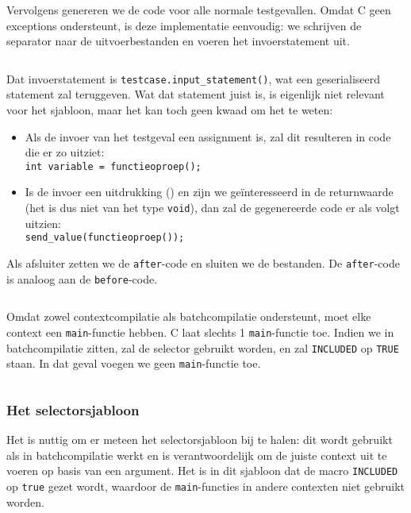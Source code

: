\inputminted[firstline=38,lastline=49]{mako}{sources/c-context.mako}

Vervolgens genereren we de code voor alle normale testgevallen.
Omdat C geen exceptions ondersteunt, is deze implementatie eenvoudig: we schrijven de separator naar de uitvoerbestanden en voeren het invoerstatement uit.

\inputminted[firstline=52,lastline=56]{mako}{sources/c-context.mako}

Dat invoerstatement is \texttt{testcase.input\_statement()}, wat een geserialiseerd statement zal teruggeven.
Wat dat statement juist is, is eigenlijk niet relevant voor het sjabloon, maar het kan toch geen kwaad om het te weten:

\begin{itemize}
    \item Als de invoer van het testgeval een assignment is, zal dit resulteren in code die er zo uitziet: \\
    \texttt{int variable = functieoproep();}
    
    \item Is de invoer een uitdrukking () en zijn we geïnteresseerd in de returnwaarde (het is dus niet van het type \texttt{void}), dan zal de gegenereerde code er als volgt uitzien: \\
    \texttt{send_value(functieoproep());}
\end{itemize}

Als afsluiter zetten we de \texttt{after}-code en sluiten we de bestanden.
De \texttt{after}-code is analoog aan de \texttt{before}-code.

\inputminted[firstline=58,lastline=63]{mako}{sources/c-context.mako}

Omdat \tested{} zowel contextcompilatie als batchcompilatie ondersteunt, moet elke context een \texttt{main}-functie hebben.
C laat slechts 1 \texttt{main}-functie toe.
Indien we in batchcompilatie zitten, zal de selector gebruikt worden, en zal \texttt{INCLUDED} op \texttt{TRUE} staan.
In dat geval voegen we geen \texttt{main}-functie toe.

\inputminted[firstline=65,lastline=69]{mako}{sources/c-context.mako}

\subsubsection{Het selectorsjabloon}

Het is nuttig om er meteen het selectorsjabloon bij te halen: dit wordt gebruikt als \tested{} in batchcompilatie werkt en is verantwoordelijk om de juiste context uit te voeren op basis van een argument.
Het is in dit sjabloon dat de macro \texttt{INCLUDED} op \texttt{true} gezet wordt, waardoor de \texttt{main}-functies in andere contexten niet gebruikt worden.

